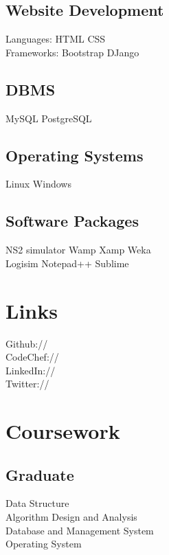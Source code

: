 \documentclass[]{deedy-resume-openfont}
\begin{document}
\begin{minipage}[t]{0.33\textwidth}
\subsection{Website Development}
Languages: HTML \textbullet{} CSS \\
Frameworks: Bootstrap \textbullet{} DJango
\sectionsep
\subsection{DBMS}
MySQL \textbullet{} PostgreSQL
\sectionsep
\subsection{Operating Systems}
Linux \textbullet{} Windows
\sectionsep
\subsection{Software Packages}
NS2 simulator \textbullet{} Wamp \textbullet{} Xamp \textbullet{} Weka \\ Logisim \textbullet{} Notepad++ \textbullet{} Sublime 
\sectionsep



\section{Links} 
Github:// \href{https://github.com/Diksha-Rathi}{} \\
CodeChef://  \href{https://www.codechef.com/users/codegirl1995}{} \\
LinkedIn://  \href{https://www.linkedin.com/in/diksharathi}{} \\
Twitter://  \href{https://twitter.com/diksha_28795}{} \\
\sectionsep


\section{Coursework}
\subsection{Graduate}
Data Structure \\
Algorithm Design and Analysis \\
Database and Management System \\
Operating System \\
\sectionsep

%
%

\end{minipage} 
\end{document}
